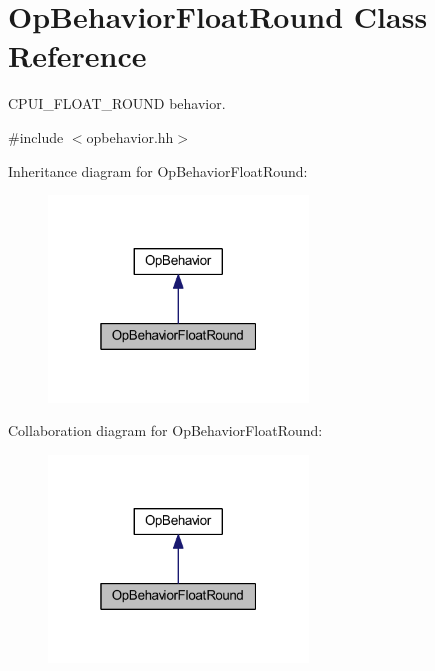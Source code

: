 \hypertarget{class_op_behavior_float_round}{}\section{Op\+Behavior\+Float\+Round Class Reference}
\label{class_op_behavior_float_round}


C\+P\+U\+I\+\_\+\+F\+L\+O\+A\+T\+\_\+\+R\+O\+U\+ND behavior.  




{\ttfamily \#include $<$opbehavior.\+hh$>$}



Inheritance diagram for Op\+Behavior\+Float\+Round\+:
\nopagebreak
\begin{figure}[H]
\begin{center}
\leavevmode
\includegraphics[width=196pt]{class_op_behavior_float_round__inherit__graph}
\end{center}
\end{figure}


Collaboration diagram for Op\+Behavior\+Float\+Round\+:
\nopagebreak
\begin{figure}[H]
\begin{center}
\leavevmode
\includegraphics[width=196pt]{class_op_behavior_float_round__coll__graph}
\end{center}
\end{figure}
